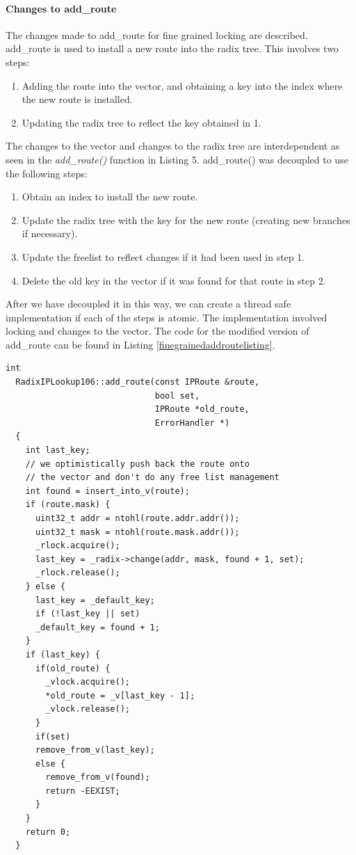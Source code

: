\documentclass{article}
\begin{document}
\paragraph{Changes to add\_route}
The changes made to add\_route for fine grained locking are described.
add\_route is used to install a new route into the radix tree. This involves two steps:
\begin{enumerate}
\item Adding the route into the vector, and obtaining a key into the index where the new route is installed.
\item Updating the radix tree to reflect the key obtained in 1.
\end{enumerate}
The changes to the vector and changes to the radix tree are interdependent as seen in the \emph{add\_route()} function in Listing 5.
add\_route() was decoupled to use the following steps:
\begin{enumerate}
\item  Obtain an index to install the new route.
\item Update the radix tree with the key for the new route 
(creating new branches if necessary).
\item Update the freelist to reflect changes if it had been used in step 1.
\item Delete the old key in the vector if it was found for that route in step 2.
\end{enumerate}
After we have decoupled it in this way, we can create a thread safe implementation if each of the steps is atomic. The implementation involved locking and changes to the vector. The code for the modified version of add\_route can be found in Listing \ref{finegrainedaddroutelisting}.
\begin{lstlisting}[caption=Fine-grained add\_route(), label=finegrainedaddroutelisting]
  int
  RadixIPLookup106::add_route(const IPRoute &route, 
                              bool set, 
                              IPRoute *old_route, 
                              ErrorHandler *)
  {
    int last_key;
    // we optimistically push back the route onto
    // the vector and don't do any free list management
    int found = insert_into_v(route);
    if (route.mask) {
      uint32_t addr = ntohl(route.addr.addr());
      uint32_t mask = ntohl(route.mask.addr());
      _rlock.acquire();
      last_key = _radix->change(addr, mask, found + 1, set);
      _rlock.release();
    } else {
      last_key = _default_key;
      if (!last_key || set)
      _default_key = found + 1;
    }
    if (last_key) { 
      if(old_route) { 
        _vlock.acquire();
        *old_route = _v[last_key - 1];
        _vlock.release();
      }
      if(set)
      remove_from_v(last_key);
      else {
        remove_from_v(found);
        return -EEXIST;
      }
    }
    return 0;
  }
\end{lstlisting}
\end{document}

